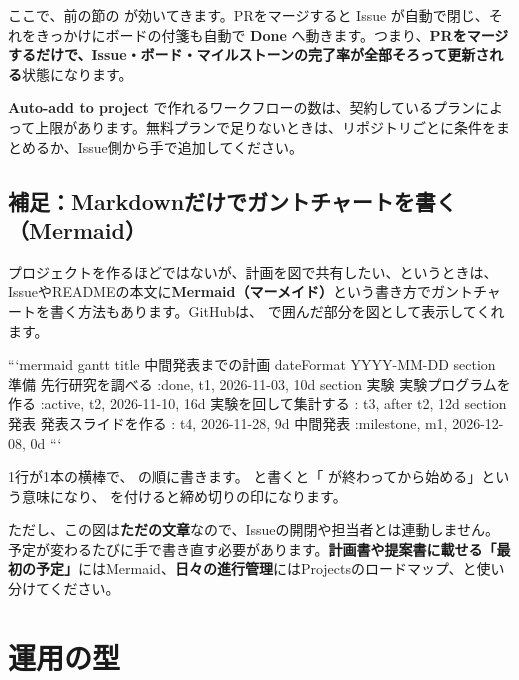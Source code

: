 \medskip

ここで、前の節の\textbf{} が効いてきます。PRをマージすると Issue  が自動で閉じ、それをきっかけにボードの付箋も自動で \textbf{Done} へ動きます。つまり、\textbf{PRをマージするだけで、Issue・ボード・マイルストーンの完了率が全部そろって更新される}状態になります。

\begin{notebox}
\textbf{Auto-add to project} で作れるワークフローの数は、契約しているプランによって上限があります。無料プランで足りないときは、リポジトリごとに条件をまとめるか、Issue側から手で追加してください。
\end{notebox}

\subsection{補足：Markdownだけでガントチャートを書く（Mermaid）}

プロジェクトを作るほどではないが、計画を図で共有したい、というときは、IssueやREADMEの本文に\textbf{Mermaid（マーメイド）}という書き方でガントチャートを書く方法もあります。GitHubは、 で囲んだ部分を図として表示してくれます。

\begin{codebox}[markdown]
\begin{code}
```mermaid
gantt
    title 中間発表までの計画
    dateFormat YYYY-MM-DD
    section 準備
    先行研究を調べる      :done,   t1, 2026-11-03, 10d
    section 実験
    実験プログラムを作る  :active, t2, 2026-11-10, 16d
    実験を回して集計する  :        t3, after t2, 12d
    section 発表
    発表スライドを作る    :        t4, 2026-11-28, 9d
    中間発表              :milestone, m1, 2026-12-08, 0d
```
\end{code}
\end{codebox}

1行が1本の横棒で、 の順に書きます。 と書くと「 が終わってから始める」という意味になり、 を付けると締め切りの印になります。

ただし、この図は\textbf{ただの文章}なので、Issueの開閉や担当者とは連動しません。予定が変わるたびに手で書き直す必要があります。\textbf{計画書や提案書に載せる「最初の予定」}にはMermaid、\textbf{日々の進行管理}にはProjectsのロードマップ、と使い分けてください。

\section{運用の型}

